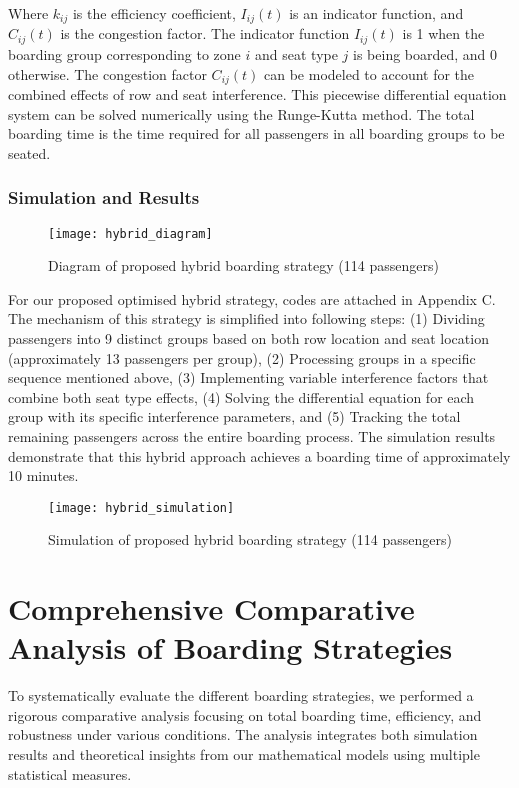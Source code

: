 \documentclass[12pt]{article}
\begin{document}
Where $k_{ij}$ is the efficiency coefficient, $I_{ij}(t)$ is an indicator function, and $C_{ij}(t)$ is the congestion factor. The indicator function $I_{ij}(t)$ is 1 when the boarding group corresponding to zone $i$ and seat type $j$ is being boarded, and 0 otherwise. The congestion factor $C_{ij}(t)$ can be modeled to account for the combined effects of row and seat interference. This piecewise differential equation system can be solved numerically using the Runge-Kutta method. The total boarding time is the time required for all passengers in all boarding groups to be seated.

\subsubsection{Simulation and Results}

\begin{figure}[h]
    \centering
    \texttt{[image: hybrid\_diagram]}
    \caption{Diagram of proposed hybrid boarding strategy (114 passengers)}
    \label{fig:hybrid_diagram}
\end{figure}

For our proposed optimised hybrid strategy, codes are attached in Appendix C. The mechanism of this strategy is simplified into following steps: (1) Dividing passengers into 9 distinct groups based on both row location and seat location (approximately 13 passengers per group), (2) Processing groups in a specific sequence mentioned above, (3) Implementing variable interference factors that combine both seat type effects, (4) Solving the differential equation for each group with its specific interference parameters, and (5) Tracking the total remaining passengers across the entire boarding process. The simulation results demonstrate that this hybrid approach achieves a boarding time of approximately 10 minutes.

\begin{figure}[h]
    \centering
    \texttt{[image: hybrid\_simulation]}
    \caption{Simulation of proposed hybrid boarding strategy (114 passengers)}
    \label{fig:hybrid_simulation}
\end{figure}

\section{Comprehensive Comparative Analysis of Boarding Strategies}

To systematically evaluate the different boarding strategies, we performed a rigorous comparative analysis focusing on total boarding time, efficiency, and robustness under various conditions. The analysis integrates both simulation results and theoretical insights from our mathematical models using multiple statistical measures.
\end{document}
